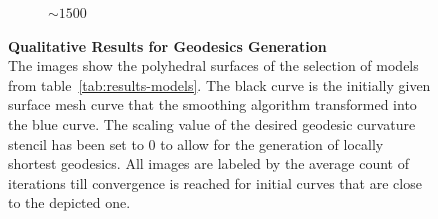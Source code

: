\documentclass{stdlocal}
\begin{document}
\begin{figure}
\begin{subfigure}[b]{0.24\linewidth}
    \caption{$\sim 1500$}
  \end{subfigure}
  \caption[Qualitative Results for Geodesics Generation]{%
    \textbf{Qualitative Results for Geodesics Generation}\\
    The images show the polyhedral surfaces of the selection of models from table~\ref{tab:results-models}.
    The black curve is the initially given surface mesh curve that the smoothing algorithm transformed into the blue curve.
    The scaling value of the desired geodesic curvature stencil has been set to $0$ to allow for the generation of locally shortest geodesics.
    All images are labeled by the average count of iterations till convergence is reached for initial curves that are close to the depicted one.
  }
  \label{fig:results-geodesics}
\end{figure}
\end{document}
